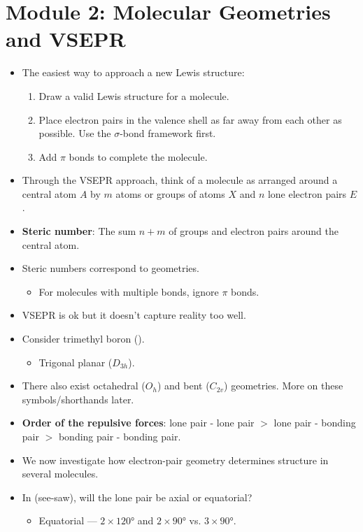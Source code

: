 \documentclass[../notes.tex]{subfiles}
\begin{document}
\section{Module 2: Molecular Geometries and VSEPR}
\begin{itemize}
    \item The easiest way to approach a new Lewis structure:
    \begin{enumerate}
        \item Draw a valid Lewis structure for a molecule.
        \item Place electron pairs in the valence shell as far away from each other as possible. Use the $\sigma$-bond framework first.
        \item Add $\pi$ bonds to complete the molecule.
    \end{enumerate}
    \item Through the VSEPR approach, think of a molecule as arranged around a central atom $A$ by $m$ atoms or groups of atoms $X$ and $n$ lone electron pairs $E$.
    \item \textbf{Steric number}: The sum $n+m$ of groups and electron pairs around the central atom.
    \item Steric numbers correspond to geometries.
    \begin{itemize}
        \item For molecules with multiple bonds, ignore $\pi$ bonds.
    \end{itemize}
    \item VSEPR is ok but it doesn't capture reality too well.
    \item Consider trimethyl boron ().
    \begin{itemize}
        \item Trigonal planar ($D_{3h}$).
    \end{itemize}
    \item There also exist octahedral ($O_h$) and bent ($C_{2v}$) geometries. More on these symbols/shorthands later.
    \item \textbf{Order of the repulsive forces}: lone pair - lone pair $>$ lone pair - bonding pair $>$ bonding pair - bonding pair.
    \item We now investigate how electron-pair geometry determines structure in several molecules.
    \item In  (see-saw), will the lone pair be axial or equatorial?
    \begin{itemize}
        \item Equatorial --- $2\times\ang{120}$ and $2\times\ang{90}$ vs. $3\times\ang{90}$.

\end{itemize}
\end{itemize}
\end{document}
